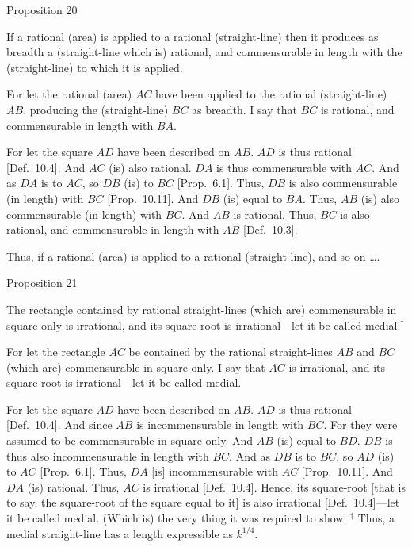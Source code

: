 
\begin{center}
{\large Proposition 20}
\end{center}

If a rational (area) is applied to a rational (straight-line) then it produces as breadth  a (straight-line which is) rational, and commensurable in length
with the (straight-line) to which it is applied.

\epsfysize=2.5in
\centerline{}

For let the rational (area) $AC$ have been applied to the rational (straight-line) $AB$, producing the (straight-line) $BC$ as breadth. I say that
$BC$ is rational, and commensurable in length with $BA$.

For let the square $AD$ have been described on $AB$. $AD$ is thus rational
[Def.~10.4]. And $AC$ (is) also rational. $DA$
is thus commensurable  with $AC$. And as $DA$ is to $AC$, so $DB$ (is)
to $BC$ [Prop.~6.1]. Thus, $DB$ is also
commensurable (in length) with $BC$ [Prop.~10.11]. And $DB$ (is) equal to $BA$. Thus, $AB$ (is)
also commensurable (in length) with $BC$. And $AB$ is rational. Thus, $BC$ is
also rational, and commensurable in length with $AB$ [Def.~10.3]. 

Thus, if  a rational (area) is applied to a rational (straight-line), and so
on \ldots.


\begin{center}
{\large Proposition 21}
\end{center}

The rectangle contained by rational straight-lines (which are) commensurable in square only is irrational, and its square-root  is irrational---let it be called medial.$^\dag$

\epsfysize=2.5in
\centerline{}

For let the rectangle $AC$ be contained by the rational straight-lines $AB$ and $BC$  (which are) commensurable in square only. I say that $AC$ is irrational, and
its square-root is irrational---let it be called
medial.

For let the square $AD$ have been described on  $AB$. $AD$ is thus
rational [Def.~10.4]. And since $AB$ is incommensurable in length with $BC$. For they were assumed to be commensurable in square only. And $AB$ (is) equal to $BD$. $DB$ is thus
also incommensurable in length with $BC$. And as $DB$ is to $BC$, so
$AD$ (is) to $AC$ [Prop.~6.1]. Thus, $DA$ [is]
incommensurable with $AC$ [Prop.~10.11]. And $DA$ (is) rational. Thus, $AC$ is irrational [Def.~10.4]. Hence, its square-root [that is to say, the square-root of the square equal to it] is also irrational [Def.~10.4]---let it be called medial. (Which is) the
very thing it was required to show.
{\footnotesize\noindent$^\dag$ 
Thus, a medial straight-line has a length expressible as $k^{1/4}$.}
\newpage

